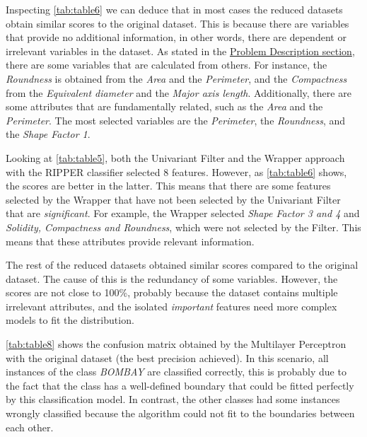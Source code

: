 \documentclass[a4paper,11pt]{article}
\begin{document}

Inspecting \autoref{tab:table6} we can deduce that in most cases the reduced datasets obtain similar scores to the original dataset. This is because there are variables that provide no additional information, in other words, there are dependent or irrelevant variables in the dataset. As stated in the \hyperref[sec:problem]{Problem Description section}, there are some variables that are calculated from others. For instance, the \textit{Roundness} is obtained from the \textit{Area} and the \textit{Perimeter}, and the \textit{Compactness} from the \textit{Equivalent diameter} and the \textit{Major axis length}. Additionally, there are some attributes that are fundamentally related, such as the \textit{Area} and the \textit{Perimeter}. The most selected variables are the \textit{Perimeter}, the \textit{Roundness}, and the \textit{Shape Factor 1}.

Looking at \autoref{tab:table5}, both the Univariant Filter and the Wrapper approach with the RIPPER classifier selected 8 features. However, as \autoref{tab:table6} shows, the scores are better in the latter. This means that there are some features selected by the Wrapper that have not been selected by the Univariant Filter that are \textit{significant}. For example, the Wrapper selected \textit{Shape Factor 3 and 4} and \textit{Solidity, Compactness and Roundness}, which were not selected by the Filter. This means that these attributes provide relevant information.

The rest of the reduced datasets obtained similar scores compared to the original dataset. The cause of this is the redundancy of some variables. However, the scores are not close to 100\%, probably because the dataset contains multiple irrelevant attributes, and the isolated \textit{important} features need more complex models to fit the distribution.

\autoref{tab:table8} shows the confusion matrix obtained by the Multilayer Perceptron with the original dataset (the best precision achieved). In this scenario, all instances of the class \textit{BOMBAY} are classified correctly, this is probably due to the fact that the class has a well-defined boundary that could be fitted perfectly by this classification model. In contrast, the other classes had some instances wrongly classified because the algorithm could not fit to the boundaries between each other.
\end{document}
